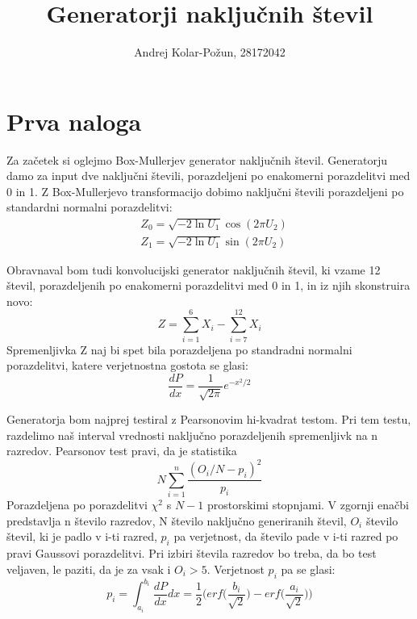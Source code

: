 \documentclass{article}
\title{Generatorji naključnih števil}
\author{Andrej Kolar-Požun, 28172042}
\begin{document}
\maketitle
\newpage
{}
\section{Prva naloga}

Za začetek si oglejmo Box-Mullerjev generator naključnih števil.
Generatorju damo za input dve naključni števili, porazdeljeni po enakomerni porazdelitvi med 0 in 1.
Z Box-Mullerjevo transformacijo dobimo naključni števili porazdeljeni po standardni normalni porazdelitvi:
\begin{align*}
&Z_0 = \sqrt{-2 \ln U_1} \cos (2\pi U_2) \\
&Z_1 = \sqrt{-2 \ln U_1} \sin (2\pi U_2)
\end{align*}

Obravnaval bom tudi konvolucijski generator naključnih števil, ki vzame 12 števil, porazdeljenih po enakomerni porazdelitvi med 0 in 1, in iz njih skonstruira novo:
\begin{equation*}
Z = \sum_{i=1}^6 X_i - \sum_{i=7}^{12} X_i
\end{equation*}
Spremenljivka Z naj bi spet bila porazdeljena po standradni normalni porazdelitvi, katere verjetnostna gostota se glasi:
\begin{equation*}
\frac{dP}{dx} = \frac{1}{\sqrt{2 \pi}} e^{-x^2/2}
\end{equation*}


Generatorja bom najprej testiral z Pearsonovim hi-kvadrat testom. Pri tem testu, razdelimo naš interval vrednosti naključno porazdeljenih spremenljivk na n razredov. Pearsonov test pravi, da je statistika
\begin{equation*}
N \sum_{i=1}^n \frac{(O_i/N - p_i)^2}{p_i}
\end{equation*}
Porazdeljena po porazdelitvi $\chi^2$ s $N-1$ prostorskimi stopnjami. V zgornji enačbi predstavlja n število razredov, N število naključno generiranih števil, $O_i$ število števil, ki je padlo v i-ti razred, $p_i$ pa verjetnost, da število pade v i-ti razred po pravi Gaussovi porazdelitvi. Pri izbiri števila razredov bo treba, da bo test veljaven, le paziti, da je za vsak i $O_i > 5$. Verjetnost $p_i$ pa se glasi:
\begin{equation*}
p_i = \int_{a_i}^{b_i} \frac{dP}{dx} dx = \frac{1}{2} \Big(erf\Big(\frac{b_i}{\sqrt{2}}\Big) - erf\Big(\frac{a_i}{\sqrt{2}}\Big)\Big)
\end{equation*}
\end{document}
